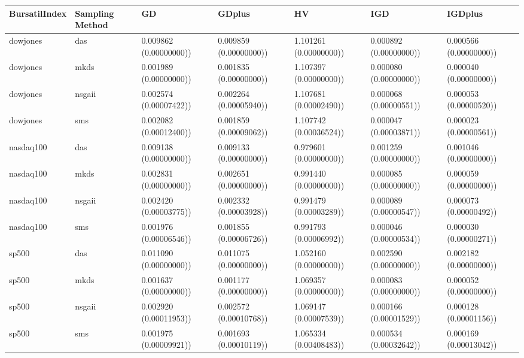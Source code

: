 \begin{tabular}{lllllll}
\toprule
BursatilIndex & Sampling Method & GD & GDplus & HV & IGD & IGDplus \\
\midrule
dowjones & das & 0.009862 (0.00000000)) & 0.009859 (0.00000000)) & 1.101261 (0.00000000)) & 0.000892 (0.00000000)) & 0.000566 (0.00000000)) \\
dowjones & mkds & 0.001989 (0.00000000)) & 0.001835 (0.00000000)) & 1.107397 (0.00000000)) & 0.000080 (0.00000000)) & 0.000040 (0.00000000)) \\
dowjones & nsgaii & 0.002574 (0.00007422)) & 0.002264 (0.00005940)) & 1.107681 (0.00002490)) & 0.000068 (0.00000551)) & 0.000053 (0.00000520)) \\
dowjones & sms & 0.002082 (0.00012400)) & 0.001859 (0.00009062)) & 1.107742 (0.00036524)) & 0.000047 (0.00003871)) & 0.000023 (0.00000561)) \\
nasdaq100 & das & 0.009138 (0.00000000)) & 0.009133 (0.00000000)) & 0.979601 (0.00000000)) & 0.001259 (0.00000000)) & 0.001046 (0.00000000)) \\
nasdaq100 & mkds & 0.002831 (0.00000000)) & 0.002651 (0.00000000)) & 0.991440 (0.00000000)) & 0.000085 (0.00000000)) & 0.000059 (0.00000000)) \\
nasdaq100 & nsgaii & 0.002420 (0.00003775)) & 0.002332 (0.00003928)) & 0.991479 (0.00003289)) & 0.000089 (0.00000547)) & 0.000073 (0.00000492)) \\
nasdaq100 & sms & 0.001976 (0.00006546)) & 0.001855 (0.00006726)) & 0.991793 (0.00006992)) & 0.000046 (0.00000534)) & 0.000030 (0.00000271)) \\
sp500 & das & 0.011090 (0.00000000)) & 0.011075 (0.00000000)) & 1.052160 (0.00000000)) & 0.002590 (0.00000000)) & 0.002182 (0.00000000)) \\
sp500 & mkds & 0.001637 (0.00000000)) & 0.001177 (0.00000000)) & 1.069357 (0.00000000)) & 0.000083 (0.00000000)) & 0.000052 (0.00000000)) \\
sp500 & nsgaii & 0.002920 (0.00011953)) & 0.002572 (0.00010768)) & 1.069147 (0.00007539)) & 0.000166 (0.00001529)) & 0.000128 (0.00001156)) \\
sp500 & sms & 0.001975 (0.00009921)) & 0.001693 (0.00010119)) & 1.065334 (0.00408483)) & 0.000534 (0.00032642)) & 0.000169 (0.00013042)) \\
\bottomrule
\end{tabular}
